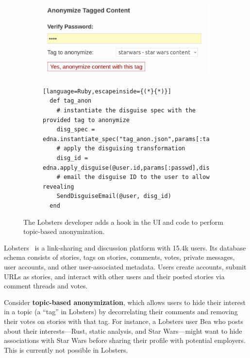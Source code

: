 \begin{figure}[h]
  \centering
  \begin{subfigure}[h]{0.5\columnwidth}
  \includegraphics[width=\columnwidth]{figs/lobsters_catanon}
  \end{subfigure}
  \begin{subfigure}[h]{\columnwidth}
  \begin{lstlisting}[language=Ruby,escapeinside={(*}{*)}]
  def tag_anon
    # instantiate the disguise spec with the provided tag to anonymize
    disg_spec = edna.instantiate_spec("tag_anon.json",params[:tag])
    # apply the disguising transformation
    disg_id = edna.apply_disguise(@user.id,params[:passwd],disg_spec)
    # email the disguise ID to the user to allow revealing
    SendDisguiseEmail(@user, disg_id)
  end
  \end{lstlisting}
  \end{subfigure}
  \vspace*{-1em}
  \caption{The Lobsters developer adds a hook in the UI and code to perform
      topic-based anonymization.}
  \label{f:lobsters_hook}
  \end{figure}

Lobsters~\cite{lobsters} is a link-sharing and discussion platform with 15.4k
users.
%
Its database schema consists of stories, tags on stories, comments, votes,
private messages, user accounts, and other user-associated metadata.
%
Users create accounts, submit URLs as stories, and interact with other users
and their posted stories via comment threads and votes.
%

Consider \textbf{topic-based anonymization}, which allows users to
hide their interest in a topic (a ``tag'' in Lobsters) by decorrelating
their comments and removing their votes on stories with that tag.
%
For instance, a Lobsters user Bea who posts about their interests---Rust,
static analysis, and Star Wars---might want to hide associations with
Star Wars before sharing their profile with potential employers.
%
This is currently not possible in Lobsters.

